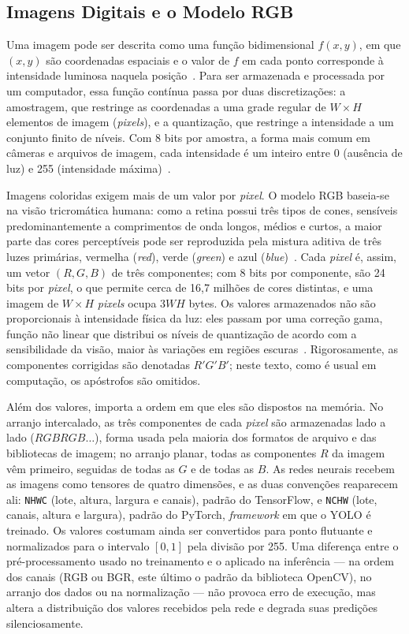 \subsection{Imagens Digitais e o Modelo RGB} \label{sec:rgb}

Uma imagem pode ser descrita como uma função bidimensional $f(x, y)$, em que $(x, y)$ são coordenadas espaciais e o valor de $f$ em cada ponto corresponde à intensidade luminosa naquela posição~\cite{gonzalez2018digital}. Para ser armazenada e processada por um computador, essa função contínua passa por duas discretizações: a amostragem, que restringe as coordenadas a uma grade regular de $W \times H$ elementos de imagem (\textit{pixels}), e a quantização, que restringe a intensidade a um conjunto finito de níveis. Com 8 bits por amostra, a forma mais comum em câmeras e arquivos de imagem, cada intensidade é um inteiro entre 0 (ausência de luz) e 255 (intensidade máxima)~\cite{gonzalez2018digital}.

Imagens coloridas exigem mais de um valor por \textit{pixel}. O modelo RGB baseia-se na visão tricromática humana: como a retina possui três tipos de cones, sensíveis predominantemente a comprimentos de onda longos, médios e curtos, a maior parte das cores perceptíveis pode ser reproduzida pela mistura aditiva de três luzes primárias, vermelha (\textit{red}), verde (\textit{green}) e azul (\textit{blue})~\cite{gonzalez2018digital}. Cada \textit{pixel} é, assim, um vetor $(R, G, B)$ de três componentes; com 8 bits por componente, são 24 bits por \textit{pixel}, o que permite cerca de 16,7 milhões de cores distintas, e uma imagem de $W \times H$ \textit{pixels} ocupa $3WH$ bytes. Os valores armazenados não são proporcionais à intensidade física da luz: eles passam por uma correção gama, função não linear que distribui os níveis de quantização de acordo com a sensibilidade da visão, maior às variações em regiões escuras~\cite{poynton2012digital}. Rigorosamente, as componentes corrigidas são denotadas $R'G'B'$; neste texto, como é usual em computação, os apóstrofos são omitidos.

Além dos valores, importa a ordem em que eles são dispostos na memória. No arranjo intercalado, as três componentes de cada \textit{pixel} são armazenadas lado a lado ($RGBRGB\ldots$), forma usada pela maioria dos formatos de arquivo e das bibliotecas de imagem; no arranjo planar, todas as componentes $R$ da imagem vêm primeiro, seguidas de todas as $G$ e de todas as $B$. As redes neurais recebem as imagens como tensores de quatro dimensões, e as duas convenções reaparecem ali: \texttt{NHWC} (lote, altura, largura e canais), padrão do TensorFlow, e \texttt{NCHW} (lote, canais, altura e largura), padrão do PyTorch, \textit{framework} em que o YOLO é treinado. Os valores costumam ainda ser convertidos para ponto flutuante e normalizados para o intervalo $[0, 1]$ pela divisão por 255. Uma diferença entre o pré-processamento usado no treinamento e o aplicado na inferência --- na ordem dos canais (RGB ou BGR, este último o padrão da biblioteca OpenCV), no arranjo dos dados ou na normalização --- não provoca erro de execução, mas altera a distribuição dos valores recebidos pela rede e degrada suas predições silenciosamente.

